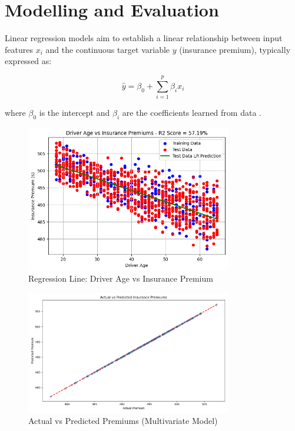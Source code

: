 \documentclass{article}
\begin{document}
\newpage
\section{Modelling and Evaluation}

Linear regression models aim to establish a linear relationship between input features $x_i$ and the continuous target variable $y$ (insurance premium), typically expressed as:

$$
\hat{y} = \beta_0 + \sum_{i=1}^p \beta_i x_i
$$

where $\beta_0$ is the intercept and $\beta_i$ are the coefficients learned from data \cite{hastie_09_elements-of.statistical-learning}.



\begin{figure}[h]
\centering
\includegraphics[width=0.8\textwidth]{age_insurance_LR.png}
\caption{Regression Line: Driver Age vs Insurance Premium}
\label{fig:regression_age}
\end{figure}

\begin{figure}[h]
\centering
\includegraphics[width=0.8\textwidth]{actual_vs_predicted.png}
\caption{Actual vs Predicted Premiums (Multivariate Model)}
\label{fig:multivariate_regression}
\end{figure}
\end{document}

